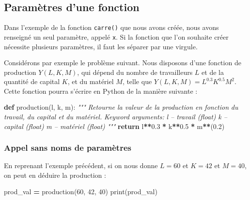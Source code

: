\documentclass[12pt,]{book}
\newenvironment{Shaded}{\begin{snugshade}}{\end{snugshade}}
\newcommand{\KeywordTok}[1]{\textcolor[rgb]{0.13,0.29,0.53}{\textbf{#1}}}
\newcommand{\DecValTok}[1]{\textcolor[rgb]{0.00,0.00,0.81}{#1}}
\newcommand{\FloatTok}[1]{\textcolor[rgb]{0.00,0.00,0.81}{#1}}
\newcommand{\CommentTok}[1]{\textcolor[rgb]{0.56,0.35,0.01}{\textit{#1}}}
\newcommand{\ControlFlowTok}[1]{\textcolor[rgb]{0.13,0.29,0.53}{\textbf{#1}}}
\newcommand{\OperatorTok}[1]{\textcolor[rgb]{0.81,0.36,0.00}{\textbf{#1}}}
\newcommand{\BuiltInTok}[1]{#1}
\newcommand{\NormalTok}[1]{#1}
\numberwithin{equation}{section}
\numberwithin{countremarque}{section}
\begin{document}
\subsection{Paramètres d'une fonction}\label{parametres-dune-fonction}

Dans l'exemple de la fonction \texttt{carre()} que nous avons créée,
nous avons renseigné un seul paramètre, appelé \texttt{x}. Si la
fonction que l'on souhaite créer nécessite plusieurs paramètres, il faut
les séparer par une virgule.

Considérons par exemple le problème suivant. Nous disposons d'une
fonction de production \(Y(L, K, M)\), qui dépend du nombre de
travailleurs \(L\) et de la quantité de capital \(K\), et du matériel
\(M\), telle que \(Y(L, K, M) = L^{0.3} K^{0.5}M^2\). Cette fonction
pourra s'écrire en Python de la manière suivante :

\begin{Shaded}
\begin{Highlighting}[]
\KeywordTok{def}\NormalTok{ production(l, k, m):}
  \CommentTok{"""}
\CommentTok{  Retourne la valeur de la production en fonction}
\CommentTok{  du travail, du capital et du matériel.}
\CommentTok{  }
\CommentTok{  Keyword arguments:}
\CommentTok{  l -- travail (float)}
\CommentTok{  k -- capital (float)}
\CommentTok{  m -- matériel (float)}
\CommentTok{  """}
  \ControlFlowTok{return}\NormalTok{ l}\OperatorTok{**}\FloatTok{0.3} \OperatorTok{*}\NormalTok{ k}\OperatorTok{**}\FloatTok{0.5} \OperatorTok{*}\NormalTok{ m}\OperatorTok{**}\NormalTok{(}\FloatTok{0.2}\NormalTok{)}
\end{Highlighting}
\end{Shaded}

\subsubsection{Appel sans noms de
paramètres}\label{appel-sans-noms-de-parametres}

En reprenant l'exemple précédent, si on nous donne \(L = 60\) et
\(K = 42\) et \(M = 40\), on peut en déduire la production :

\begin{Shaded}
\begin{Highlighting}[]
\NormalTok{prod_val }\OperatorTok{=}\NormalTok{ production(}\DecValTok{60}\NormalTok{, }\DecValTok{42}\NormalTok{, }\DecValTok{40}\NormalTok{)}
\BuiltInTok{print}\NormalTok{(prod_val)}
\end{Highlighting}
\end{Shaded}
\end{document}
